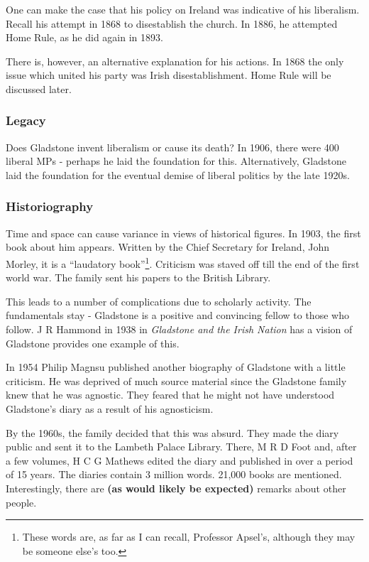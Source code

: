 \documentclass[11pt,a4paper]{report}
\begin{document}
\begin{multicols}{2}
		One can make the case that his policy on Ireland was indicative of his liberalism. Recall his attempt in 1868 to disestablish the church. In 1886, he attempted Home Rule, as he did again in 1893.
		
		There is, however, an alternative explanation for his actions. In 1868 the only issue which united his party was Irish disestablishment. Home Rule will be discussed later.
		
		\subsubsection{Legacy}
		
		Does Gladstone invent liberalism or cause its death? In 1906, there were 400 liberal MPs - perhaps he laid the foundation for this. Alternatively, Gladstone laid the foundation for the eventual demise of liberal politics by the late 1920s.
		
		\subsubsection{Historiography}
		
		Time and space can cause variance in views of historical figures. In 1903, the first book about him appears. Written by the Chief Secretary for Ireland, John Morley, it is a ``laudatory book''\footnote{These words are, as far as I can recall, Professor Apsel's, although they may be someone else's too.}. Criticism was staved off till the end of the first world war. The family sent his papers to the British Library.
		
		This leads to a number of complications due to scholarly activity. The fundamentals stay - Gladstone is a positive and convincing fellow to those who follow. J R Hammond in 1938 in \textit{Gladstone and the Irish Nation} has a vision of Gladstone provides one example of this.
		
		In 1954 Philip Magnsu published another biography of Gladstone with a little criticism. He was deprived of much source material since the Gladstone family knew that he was agnostic. They feared that he might not have understood Gladstone's diary as a result of his agnosticism. 
		
		By the 1960s, the family decided that this was absurd. They made the diary public and sent it to the Lambeth Palace Library. There, M R D Foot and, after a few volumes, H C G Mathews edited the diary and published in over a period of 15 years. The diaries contain 3 million words. 21,000 books are mentioned. Interestingly, there are \textbf{(as would likely be expected)} remarks about other people.
		

\end{multicols}
\end{document}
